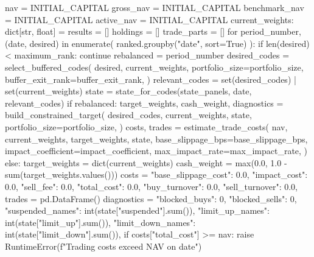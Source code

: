 \documentclass[UTF8,a4paper,fontset=fandol]{ctexart}
\begin{document}
\begin{ProjectCode}
    nav = INITIAL_CAPITAL
    gross_nav = INITIAL_CAPITAL
    benchmark_nav = INITIAL_CAPITAL
    active_nav = INITIAL_CAPITAL
    current_weights: dict[str, float] = {}
    results = []
    holdings = []
    trade_parts = []
    for period_number, (date, desired) in enumerate(
        ranked.groupby("date", sort=True)
    ):
        if len(desired) < maximum_rank:
            continue
        rebalanced = period_number %
        desired_codes = select_buffered_codes(
            desired,
            current_weights,
            portfolio_size=portfolio_size,
            buffer_exit_rank=buffer_exit_rank,
        )
        relevant_codes = set(desired_codes) | set(current_weights)
        state = state_for_codes(state_panels, date, relevant_codes)
        if rebalanced:
            target_weights, cash_weight, diagnostics = build_constrained_target(
                desired_codes,
                current_weights,
                state,
                portfolio_size=portfolio_size,
            )
            costs, trades = estimate_trade_costs(
                nav,
                current_weights,
                target_weights,
                state,
                base_slippage_bps=base_slippage_bps,
                impact_coefficient=impact_coefficient,
                max_impact_rate=max_impact_rate,
            )
        else:
            target_weights = dict(current_weights)
            cash_weight = max(0.0, 1.0 - sum(target_weights.values()))
            costs = {
                "base_slippage_cost": 0.0,
                "impact_cost": 0.0,
                "sell_fee": 0.0,
                "total_cost": 0.0,
                "buy_turnover": 0.0,
                "sell_turnover": 0.0,
            }
            trades = pd.DataFrame()
            diagnostics = {
                "blocked_buys": 0,
                "blocked_sells": 0,
                "suspended_names": int(state["suspended"].sum()),
                "limit_up_names": int(state["limit_up"].sum()),
                "limit_down_names": int(state["limit_down"].sum()),
            }
        if costs["total_cost"] >= nav:
            raise RuntimeError(f"Trading costs exceed NAV on {date}")


\end{ProjectCode}
\end{document}
